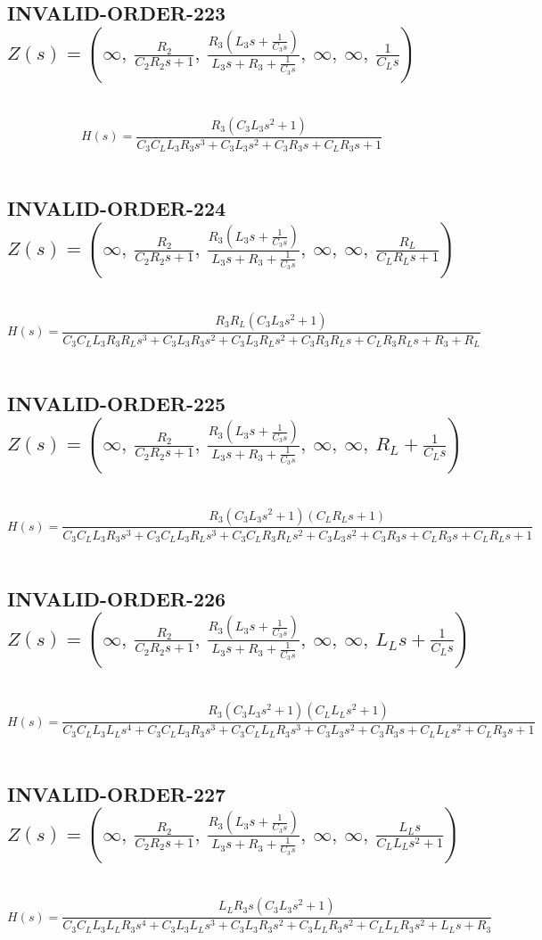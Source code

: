 \documentclass{article}
\begin{document}
\subsection{INVALID-ORDER-223 $Z(s) = \left( \infty, \  \frac{R_{2}}{C_{2} R_{2} s + 1}, \  \frac{R_{3} \left(L_{3} s + \frac{1}{C_{3} s}\right)}{L_{3} s + R_{3} + \frac{1}{C_{3} s}}, \  \infty, \  \infty, \  \frac{1}{C_{L} s}\right)$ } \ 
\textbf{\[H(s) = \frac{R_{3} \left(C_{3} L_{3} s^{2} + 1\right)}{C_{3} C_{L} L_{3} R_{3} s^{3} + C_{3} L_{3} s^{2} + C_{3} R_{3} s + C_{L} R_{3} s + 1}\] } \ 
\subsection{INVALID-ORDER-224 $Z(s) = \left( \infty, \  \frac{R_{2}}{C_{2} R_{2} s + 1}, \  \frac{R_{3} \left(L_{3} s + \frac{1}{C_{3} s}\right)}{L_{3} s + R_{3} + \frac{1}{C_{3} s}}, \  \infty, \  \infty, \  \frac{R_{L}}{C_{L} R_{L} s + 1}\right)$ } \ 
\textbf{\[H(s) = \frac{R_{3} R_{L} \left(C_{3} L_{3} s^{2} + 1\right)}{C_{3} C_{L} L_{3} R_{3} R_{L} s^{3} + C_{3} L_{3} R_{3} s^{2} + C_{3} L_{3} R_{L} s^{2} + C_{3} R_{3} R_{L} s + C_{L} R_{3} R_{L} s + R_{3} + R_{L}}\] } \ 
\subsection{INVALID-ORDER-225 $Z(s) = \left( \infty, \  \frac{R_{2}}{C_{2} R_{2} s + 1}, \  \frac{R_{3} \left(L_{3} s + \frac{1}{C_{3} s}\right)}{L_{3} s + R_{3} + \frac{1}{C_{3} s}}, \  \infty, \  \infty, \  R_{L} + \frac{1}{C_{L} s}\right)$ } \ 
\textbf{\[H(s) = \frac{R_{3} \left(C_{3} L_{3} s^{2} + 1\right) \left(C_{L} R_{L} s + 1\right)}{C_{3} C_{L} L_{3} R_{3} s^{3} + C_{3} C_{L} L_{3} R_{L} s^{3} + C_{3} C_{L} R_{3} R_{L} s^{2} + C_{3} L_{3} s^{2} + C_{3} R_{3} s + C_{L} R_{3} s + C_{L} R_{L} s + 1}\] } \ 
\subsection{INVALID-ORDER-226 $Z(s) = \left( \infty, \  \frac{R_{2}}{C_{2} R_{2} s + 1}, \  \frac{R_{3} \left(L_{3} s + \frac{1}{C_{3} s}\right)}{L_{3} s + R_{3} + \frac{1}{C_{3} s}}, \  \infty, \  \infty, \  L_{L} s + \frac{1}{C_{L} s}\right)$ } \ 
\textbf{\[H(s) = \frac{R_{3} \left(C_{3} L_{3} s^{2} + 1\right) \left(C_{L} L_{L} s^{2} + 1\right)}{C_{3} C_{L} L_{3} L_{L} s^{4} + C_{3} C_{L} L_{3} R_{3} s^{3} + C_{3} C_{L} L_{L} R_{3} s^{3} + C_{3} L_{3} s^{2} + C_{3} R_{3} s + C_{L} L_{L} s^{2} + C_{L} R_{3} s + 1}\] } \ 
\subsection{INVALID-ORDER-227 $Z(s) = \left( \infty, \  \frac{R_{2}}{C_{2} R_{2} s + 1}, \  \frac{R_{3} \left(L_{3} s + \frac{1}{C_{3} s}\right)}{L_{3} s + R_{3} + \frac{1}{C_{3} s}}, \  \infty, \  \infty, \  \frac{L_{L} s}{C_{L} L_{L} s^{2} + 1}\right)$ } \ 
\textbf{\[H(s) = \frac{L_{L} R_{3} s \left(C_{3} L_{3} s^{2} + 1\right)}{C_{3} C_{L} L_{3} L_{L} R_{3} s^{4} + C_{3} L_{3} L_{L} s^{3} + C_{3} L_{3} R_{3} s^{2} + C_{3} L_{L} R_{3} s^{2} + C_{L} L_{L} R_{3} s^{2} + L_{L} s + R_{3}}\] } \ 
\end{document}
